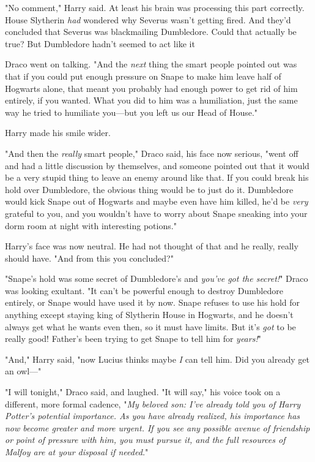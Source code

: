 "No comment," Harry said. At least his brain was processing this part
correctly. House Slytherin \emph{had} wondered why Severus wasn't getting
fired. And they'd concluded that Severus was blackmailing Dumbledore. Could
that actually be true\el? But Dumbledore hadn't seemed to act like
it{\el}

Draco went on talking. "And the \emph{next} thing the smart people pointed out
was that if you could put enough pressure on Snape to make him leave half of
Hogwarts alone, that meant you probably had enough power to get rid of him
entirely, if you wanted. What you did to him was a humiliation, just the same
way he tried to humiliate you---but you left us our Head of House."

Harry made his smile wider.

"And then the \emph{really} smart people," Draco said, his face now serious,
"went off and had a little discussion by themselves, and someone pointed out
that it would be a very stupid thing to leave an enemy around like that. If you
could break his hold over Dumbledore, the obvious thing would be to just do it.
Dumbledore would kick Snape out of Hogwarts and maybe even have him killed,
he'd be \emph{very} grateful to you, and you wouldn't have to worry about Snape
sneaking into your dorm room at night with interesting potions."

Harry's face was now neutral. He had not thought of that and he really, really
should have. "And from this you concluded\el?"

"Snape's hold was some secret of Dumbledore's and \emph{you've got the
secret!}" Draco was looking exultant. "It can't be powerful enough to destroy
Dumbledore entirely, or Snape would have used it by now. Snape refuses to use
his hold for anything except staying king of Slytherin House in Hogwarts, and
he doesn't always get what he wants even then, so it must have limits. But it's
\emph{got} to be really good! Father's been trying to get Snape to tell him for
\emph{years!}"

"And," Harry said, "now Lucius thinks maybe \emph{I} can tell him. Did you
already get an owl\mbox{---}"

"I will tonight," Draco said, and laughed. "It will say," his voice took on a
different, more formal cadence, "\emph{My beloved son: I've already told you of
Harry Potter's potential importance. As you have already realized, his
importance has now become greater and more urgent. If you see any possible
avenue of friendship or point of pressure with him, you must pursue it, and the
full resources of Malfoy are at your disposal if needed.}"

